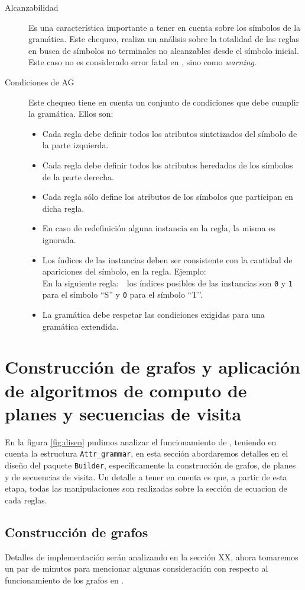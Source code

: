 \begin{description}
\item [Alcanzabilidad] Es una característica importante a tener en cuenta sobre los símbolos de la gramática. Este chequeo, realiza un análisis sobre la totalidad de las reglas en busca de símbolos no terminales no alcanzables desde el símbolo inicial. Este caso no es considerado error fatal en \maggen, sino como \textit{warning}.
\item [Condiciones de AG] Este chequeo tiene en cuenta un conjunto de condiciones que debe cumplir la gramática. Ellos son:
\begin{itemize}
\item Cada regla debe definir todos los atributos sintetizados del símbolo de la parte izquierda.
\item Cada regla debe definir todos los atributos heredados de los símbolos de la parte derecha.
\item Cada regla sólo define los atributos de los símbolos que participan en dicha regla.
\item En caso de redefinición alguna instancia en la regla, la misma es ignorada.
\item Los índices de las instancias deben ser consistente con la cantidad de apariciones del símbolo, en la regla. Ejemplo: \\En la siguiente regla:\ \ los índices posibles de las instancias son \texttt{0} y \texttt{1} para el símbolo ``S'' y \texttt{0} para el símbolo ``T''.
\item La gramática debe respetar las condiciones exigidas para una gramática extendida. 
\end{itemize}
\end{description}

\section{Construcción de grafos y aplicación de algoritmos de computo de planes y secuencias de visita}
En la figura \ref{fig:disen} pudimos analizar el funcionamiento de \maggen, teniendo en cuenta la estructura \texttt{Attr\_grammar}, en esta sección abordaremos detalles en el diseño del paquete \texttt{Builder}, específicamente la construcción de grafos, de planes y de secuencias de visita. Un detalle a tener en cuenta es que, a partir de esta etapa,  todas las manipulaciones son realizadas sobre la sección de ecuacion de cada reglas.

\subsection*{Construcción de grafos}
Detalles de implementación serán analizando en la sección XX, ahora tomaremos un par de minutos para mencionar algunas consideración con respecto al funcionamiento de los grafos en \maggen.


